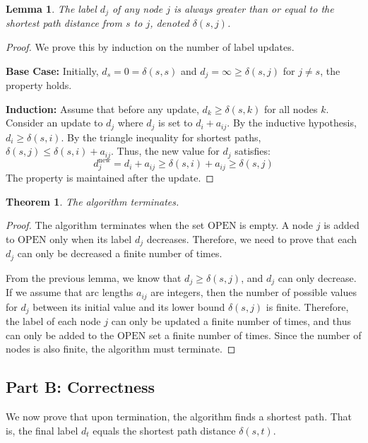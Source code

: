 \documentclass[11pt, a4paper, oneside]{memoir}
\newtheorem{theorem}{Theorem}
\newtheorem{lemma}{Lemma}
\newcommand{\OPEN}{\text{OPEN}}
\begin{document}
\begin{lemma}
  The label $d_j$ of any node $j$ is always greater than or equal to the shortest path distance from $s$ to $j$,
  denoted $\delta(s, j)$.
\end{lemma}

\begin{proof}
  We prove this by induction on the number of label updates.

  \textbf{Base Case:} Initially, $d_s = 0 = \delta(s, s)$ and $d_j = \infty \ge \delta(s, j)$ for $j \neq s$, the property holds.

  \textbf{Induction:} Assume that before any update, $d_k \ge \delta(s, k)$ for all nodes $k$.
  Consider an update to $d_j$ where $d_j$ is set to $d_i + a_{ij}$. By the inductive hypothesis,
  $d_i \ge \delta(s, i)$. By the triangle inequality for shortest paths, $\delta(s, j) \le \delta(s, i) + a_{ij}$.
  Thus, the new value for $d_j$ satisfies:
  \[ d_j^{\text{new}} = d_i + a_{ij} \ge \delta(s, i) + a_{ij} \ge \delta(s, j) \]
  The property is maintained after the update.
\end{proof}

\begin{theorem}
  The algorithm terminates.
\end{theorem}

\begin{proof}
  The algorithm terminates when the set $\OPEN$ is empty.
  A node $j$ is added to $\OPEN$ only when its label $d_j$ decreases.
  Therefore, we need to prove that each $d_j$ can only be decreased a finite number of times.

  From the previous lemma, we know that $d_j \geq \delta(s, j)$, and $d_j$ can only decrease.
  If we assume that arc lengths $a_{ij}$ are integers, then the number of possible values for $d_j$
  between its initial value and its lower bound $\delta(s, j)$ is finite.
  Therefore, the label of each node $j$ can only be updated a finite number of times,
  and thus can only be added to the $\OPEN$ set a finite number of times.
  Since the number of nodes is also finite, the algorithm must terminate.
\end{proof}

\subsection*{Part B: Correctness}
We now prove that upon termination, the algorithm finds a shortest path.
That is, the final label $d_t$ equals the shortest path distance $\delta(s, t)$.
\end{document}
